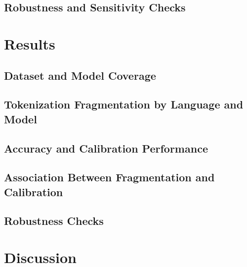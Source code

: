 \documentclass[runningheads]{llncs}
\begin{document}
\subsection{Robustness and Sensitivity Checks}

\section{Results}
\subsection{Dataset and Model Coverage}

\subsection{Tokenization Fragmentation by Language and Model}

\subsection{Accuracy and Calibration Performance}

\subsection{Association Between Fragmentation and Calibration}

\subsection{Robustness Checks}

\section{Discussion}
\end{document}
